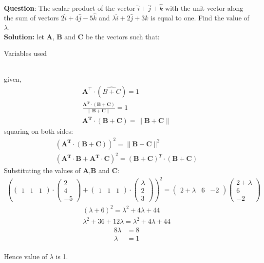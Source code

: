 \documentclass[journal]{IEEEtran}
\begin{document}
\textbf{Question}:
The scalar product of the vector $\hat{i}+\hat{j}+\hat{k}$ with the unit vector along the sum of vectors $2\hat{i} + 4\hat{j} - 5\hat{k}$ and $\lambda \hat{i} + 2\hat{j} + 3\hat{k}$ is equal to one. Find the value of $\lambda$.\\
\textbf{Solution: }
let $\mathbf{A}$, $\mathbf{B}$ and $\mathbf{C}$ be the vectors such that:
\begin{table}[h!]
    \centering
    
    \caption{Variables used}
    \label{table 1.9.1}
\end{table}\\
given,
\begin{align}
 \mathbf{A^\top} \cdot (\hat{B+C}) = 1\\
 \frac{\mathbf{A^T} \cdot (\mathbf{B}+\mathbf{C})}{\|\mathbf{B}+\mathbf{C}\|} = 1\\
\mathbf{A^T} \cdot (\mathbf{B}+\mathbf{C}) = \|\mathbf{B}+\mathbf{C}\|
\end{align}
squaring on both sides:
\begin{align}
(\mathbf{A^T} \cdot (\mathbf{B}+\mathbf{C}))^2 = \|\mathbf{B}+\mathbf{C}\|^2 \\
(\mathbf{A^T} \cdot \mathbf{B} + \mathbf{A^T} \cdot \mathbf{C})^2 = (\mathbf{B}+\mathbf{C})^T \cdot(\mathbf{B}+\mathbf{C})
\end{align}
 Substituting the values of \textbf{A},\textbf{B} and \textbf{C}: 
\begin{align}
\left(\begin{pmatrix}1 & 1 & 1\end{pmatrix} \cdot \begin{pmatrix}2 \\4 \\-5\end{pmatrix}+\begin{pmatrix}1 & 1 & 1\end{pmatrix} \cdot\begin{pmatrix}\lambda \\2 \\3\end{pmatrix}\right)^2=
\begin{pmatrix}2+\lambda & 6 & -2\end{pmatrix}\begin{pmatrix}2+\lambda \\6 \\-2\end{pmatrix}
\end{align}
\begin{align}
(\lambda+6)^2 = \lambda^2 
+ 4\lambda+44\\
\lambda^2 + 36 + 12\lambda = \lambda^2 + 4\lambda + 44  
\end{align}
\begin{align}8\lambda &= 8 \\\lambda &= 1\end{align}\\
Hence value of $\lambda$ is 1.
\end{document}
